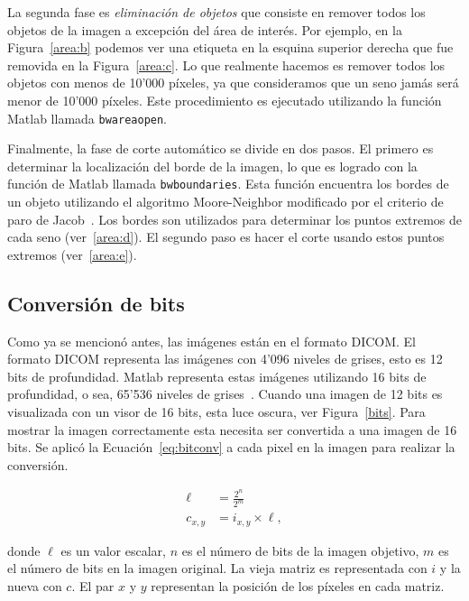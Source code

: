 La segunda fase es \textit{eliminación de objetos} que consiste en remover
todos los objetos de la imagen a excepción del área de interés. Por ejemplo, en
la Figura~\ref{area:b} podemos ver una etiqueta en la esquina superior derecha
que fue removida en la Figura~\ref{area:c}. Lo que realmente hacemos es remover
todos los objetos con menos de 10'000 píxeles, ya que consideramos que un seno
jamás será menor de 10'000 píxeles. Este procedimiento es ejecutado utilizando
la función Matlab llamada \texttt{bwareaopen}.

Finalmente, la fase de corte automático se divide en dos pasos. El primero es
determinar la localización del borde de la imagen, lo que es logrado con la
función de Matlab llamada \texttt{bwboundaries}. Esta función encuentra los
bordes de un objeto utilizando el algoritmo Moore-Neighbor modificado por el
criterio de paro de Jacob~\cite{gonzalez2009digital}. Los bordes son utilizados
para determinar los puntos extremos de cada seno (ver~\ref{area:d}). El segundo
paso es hacer el corte usando estos puntos extremos (ver~\ref{area:e}). 

\subsection{Conversión de bits}

Como ya se mencionó antes, las imágenes están en el formato DICOM. El formato
DICOM representa las imágenes con 4'096 niveles de grises, esto es 12 bits de
profundidad. Matlab representa estas imágenes utilizando 16 bits de
profundidad, o sea, 65'536 niveles de grises~\cite{mustra2008efficient}. Cuando
una imagen de 12 bits es visualizada con un visor de 16 bits, esta luce oscura,
ver Figura~\ref{bits}. Para mostrar la imagen correctamente esta necesita ser
convertida a una imagen de 16 bits. Se aplicó la Ecuación~\ref{eq:bitconv} a
cada pixel en la imagen para realizar la conversión.

\begin{equation}
\label{eq:bitconv}
    \begin{split}
            \ell &= \frac{2^{n}}{2^{m}} \\
            c_{x,y} &= i_{x, y} \times \ell,
    \end{split}
\end{equation}

\noindent donde $\ell$ es un valor escalar, $n$ es el número de bits de la imagen
objetivo, $m$ es el número de bits en la imagen original. La vieja matriz es
representada con $i$ y la nueva con $c$. El par $x$ y $y$ representan la
posición de los píxeles en cada matriz.

